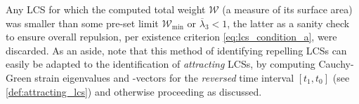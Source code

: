 Any LCS for which the computed total weight $\mathcal{W}$ (a measure of
its surface area) was smaller than some pre-set limit $\mathcal{W}_{\min}$ or
$\overline{\lambda}_{3} < 1$, the latter as a sanity
check to ensure overall repulsion, per existence criterion
\eqref{eq:lcs_condition_a}, were discarded. As an aside, note that this method
of identifying repelling LCSs can easily be adapted to the identification of
\emph{attracting} LCSs, by computing Cauchy-Green strain eigenvalues and
-vectors for the \emph{reversed} time interval $[t_{1},t_{0}]$ (see
\cref{def:attracting_lcs}) and otherwise proceeding as discussed.




